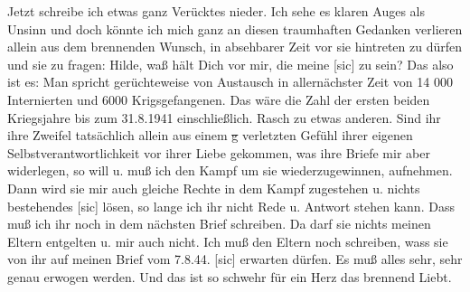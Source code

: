 \def\day{9. 8. 1944.}
\mktitle

Jetzt schreibe ich etwas ganz Ver\"{u}cktes nieder.
Ich sehe es klaren Auges als Unsinn und doch k\"{o}nnte ich mich ganz an diesen traumhaften Gedanken verlieren allein aus dem brennenden Wunsch, in absehbarer Zeit vor sie hintreten zu d\"{u}rfen und sie zu fragen: Hilde, wa{\ss} h\"{a}lt Dich vor mir, die meine{\color{red} [sic] } zu sein?
Das also ist es: Man spricht ger\"{u}chteweise von Austausch in allern\"{a}chster Zeit von 14 000 Internierten und 6000 Krigsgefangenen.
Das w\"{a}re die Zahl der ersten beiden Kriegsjahre bis zum 31.8.1941 einschlie{\ss}lich.
\hline
Rasch zu etwas anderen.
Sind ihr ihre Zweifel tats\"{a}chlich allein aus einem \st{g} verletzten Gef\"{u}hl ihrer eigenen Selbstverantwortlichkeit vor ihrer Liebe gekommen, was ihre Briefe mir aber widerlegen, so will u. mu{\ss} ich den Kampf um sie wiederzugewinnen, aufnehmen.
Dann wird sie mir auch gleiche Rechte in dem Kampf zugestehen u. nichts bestehendes{\color{red} [sic] } l\"{o}sen, so lange ich ihr nicht Rede u. Antwort stehen kann.
Dass mu{\ss} ich ihr noch in dem n\"{a}chsten Brief schreiben.
Da darf sie nichts meinen Eltern entgelten u. mir auch nicht.
Ich mu{\ss} den Eltern noch schreiben, wass sie von ihr auf meinen Brief vom 7.8.44.{\color{red} [sic] } erwarten d\"{u}rfen.
Es mu{\ss} alles sehr, sehr genau erwogen werden.
Und das ist so schwehr f\"{u}r ein Herz das brennend Liebt.

\clearpage
